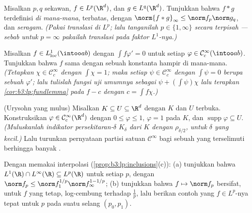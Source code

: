 \begin{exercise}[$\star\star$]\label{exo:b3:lp:6}
Misalkan $p, q$ sekawan, $f \in L^p(\R^d)$, dan $g \in
L^q(\R^d)$. Tunjukkan bahwa $f * g$ terdefinisi \emph{di mana-mana},
terbatas, dengan $\norm{f*g}_\infty \leq \norm f_p\norm g_q$, dan
\emph{ seragam}. \emph{(Pakai  translasi
di $L^p$; lalu tanganilah $p \in \{1, \infty\}$ secara terpisah --- sebab untuk $p =
\infty$ pakailah  translasi pada faktor $L^1$-nya.)}
\end{exercise}

\begin{exercise}[$\star\star$]\label{exo:b3:lp:7}
Misalkan $f \in L^1_{\mathrm{loc}}(\intoo ab)$ dengan
$\int f\varphi' = 0$ untuk setiap $\varphi \in \mathcal
C^\infty_c(\intoo ab)$. Tunjukkan bahwa $f$ sama dengan sebuah konstanta
hampir di mana-mana. \emph{(Tetapkan $\chi \in \mathcal C_c^\infty$ dengan
$\int\chi = 1$; maka setiap $\psi \in \mathcal C_c^\infty$ dengan
$\int\psi = 0$ berupa sebuah $\varphi'$; lalu tulislah fungsi uji umumnya
sebagai $\psi + (\int\psi)\chi$ lalu terapkan
\cref{cor:b3:lp:fundlemma} pada $f - c$ dengan $c = \int
f\chi$.)}
\end{exercise}

\begin{exercise}[$\star\star\star$]\label{exo:b3:lp:8}
(Urysohn yang mulus) Misalkan $K \subseteq U \subseteq \R^d$ dengan $K$
 dan $U$ terbuka. Konstruksikan $\varphi \in \mathcal
C^\infty_c(\R^d)$ dengan $0 \leq \varphi \leq 1$, $\varphi = 1$
pada $K$, dan $\operatorname{supp}\varphi \subseteq U$.
\emph{(Muluskanlah indikator persekitaran-$\delta$
$K_\delta$ dari $K$ dengan $\rho_{\delta/2}$, untuk $\delta$ yang kecil.)}
Lalu turunkan pernyataan partisi satuan $\mathcal C^\infty$ bagi
sebuah  yang terselimuti berhingga banyak .
\end{exercise}

\begin{exercise}[$\star\star$]\label{exo:b3:lp:9}
Dengan memakai interpolasi (\cref{prop:b3:lp:inclusions}(c)):
(a) tunjukkan bahwa $L^1(\R)\cap L^\infty(\R) \subseteq L^p(\R)$ untuk
setiap $p$, dengan $\norm f_p \leq \norm f_1^{1/p}\norm
f_\infty^{1 - 1/p}$;
(b) tunjukkan bahwa $f \mapsto \norm f_p$ bersifat, untuk $f$ yang tetap,
log-cembung terhadap $\frac1p$, lalu berikan contoh yang $f \in L^p$-nya
tepat untuk $p$ pada suatu selang $(p_0, p_1)$.
\end{exercise}

